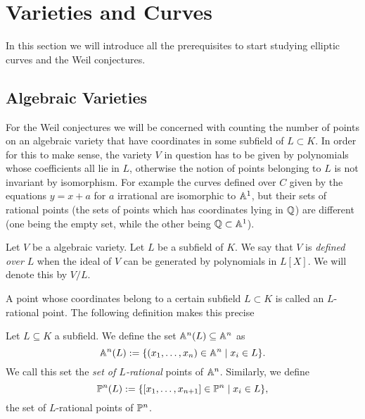 \section{Varieties and Curves}

In this section we will introduce all the prerequisites to start studying
elliptic curves and the Weil conjectures.

\subsection{Algebraic Varieties}

For the Weil conjectures we will be concerned with counting the
number of points on an algebraic variety that have coordinates
in some subfield of $L \subset K$. In order for this to make sense,
the variety $V$ in question has to be given by polynomials whose
coefficients all lie in $L$, otherwise the notion of points belonging to $L$
is not invariant by isomorphism. For example the curves defined
over $C$ given by the equations $y = x + a$ for $a$ irrational
are isomorphic to $\mathbb{A}^1$, but their sets of rational points (the
sets of points which has coordinates lying in $\mathbb{Q}$) are different
(one being the empty set, while the other being $\mathbb{Q}\subset\mathbb{A}^1$).

\begin{definition}
	Let $V$ be a algebraic variety. Let $L$ be a subfield of $K$.
	We say that $V$ is \emph{defined over} $L$ when the ideal of
	$V$ can be generated by polynomials in $L[X]$.
	We will denote this by $V/L$.
\end{definition}

A point whose coordinates belong to a certain subfield $L \subset K$
is called an $L$-rational point. The following definition makes this
precise

\begin{definition}
	Let $L \subseteq K$ a subfield.
	We define the set $\mathbb{A}^n(L) \subseteq \mathbb{A}^n$ as
	\begin{equation*}
		\mathbb{A}^n(L) := \{(x_1, \dots, x_n) \in \mathbb{A}^n \mid x_i \in L\}.
	\end{equation*}
	We call this set the \emph{set of $L$-rational} points of $\mathbb{A}^n$.
	Similarly, we define
	\begin{equation*}
		\mathbb{P}^n(L) := \{[x_1, \dots, x_{n+1}] \in \mathbb{P}^n \mid x_i \in L\},
	\end{equation*}
	the set of $L$-rational points of $\mathbb{P}^n$.
\end{definition}

